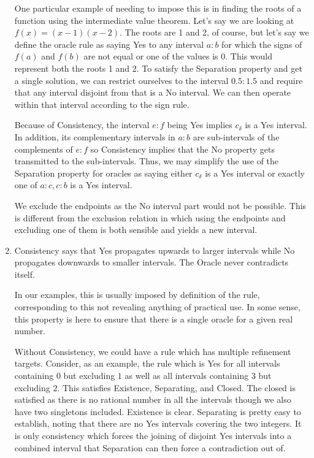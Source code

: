 \documentclass[12pt]{article}
\begin{document}
\begin{enumerate}
    One particular example of needing to impose this is in finding the roots of a function using the intermediate value theorem. Let's say we are looking at $f(x) = (x-1)(x-2)$. The roots are 1 and 2, of course, but let's say we define the oracle rule as saying Yes to any interval $a:b$ for which the signs of $f(a)$ and $f(b)$ are not equal or one of the values is 0. This would represent both the roots 1 and 2. To satisfy the Separation property and get a single solution, we can restrict ourselves to the interval $0.5:1.5$ and require that any interval disjoint from that is a No interval. We can then operate within that interval according to the sign rule. 

Because of Consistency, the interval $e:f$ being Yes implies $c_{\delta}$ is a Yes interval. In addition, its complementary intervals in $a:b$ are sub-intervals of the complements of $e:f$ so Consistency implies that the No property gets transmitted to the sub-intervals. Thus, we may simplify the use of the Separation property for oracles as saying either $c_{\delta}$ is a Yes interval or exactly one of $a:c, c:b$ is a Yes interval.

We exclude the endpoints as the No interval part would not be possible. This is different from the exclusion relation in which using the endpoints and excluding one of them is both sensible and yields a new interval. 

    \item Consistency says that Yes propagates upwards to larger intervals while No propagates downwards to smaller intervals. The Oracle never contradicts itself. 
    
    In our examples, this is usually imposed by definition of the rule, corresponding to this not revealing anything of practical use. In some sense, this property is here to ensure that there is a single oracle for a given real number.


    Without Consistency, we could have a rule which has multiple refinement targets. Consider, as an example, the rule which is Yes for all intervals containing $0$ but excluding $1$ as well as all intervals containing $3$ but excluding $2$. This satisfies Existence, Separating, and Closed. The closed is satisfied as there is no rational number in all the intervals though we also have two singletons included. Existence is clear. Separating is pretty easy to establish, noting that there are no Yes intervals covering the two integers. It is only consistency which forces the joining of disjoint Yes intervals into a combined interval that Separation can then force a contradiction out of.  


\end{enumerate}
\end{document}
